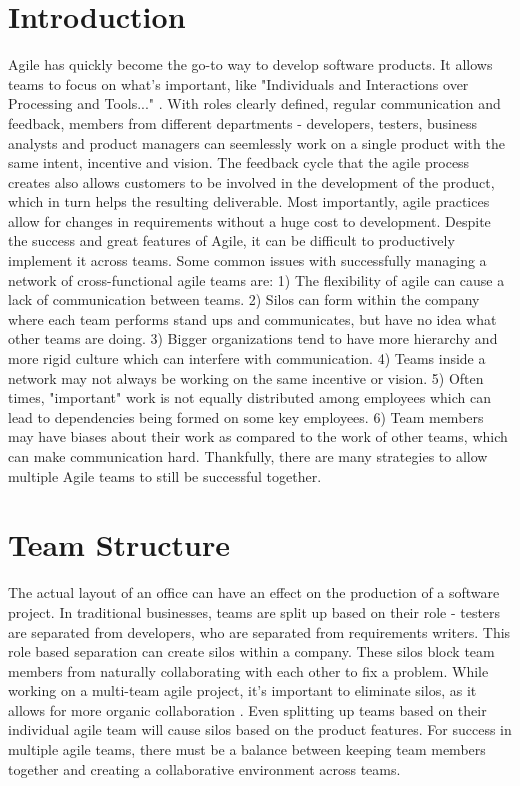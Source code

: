 \documentclass[sigplan,screen]{acmart}
\begin{document}
\section{Introduction}
Agile has quickly become the go-to way to develop software products.
It allows teams to focus on what's important, like "Individuals and Interactions over Processing and Tools..." \cite{b3}. 
With roles clearly defined, regular communication and feedback, members from different departments - developers, testers, business analysts and product managers can seemlessly work on a single product with the same intent, incentive and vision.
The feedback cycle that the agile process creates also allows customers to be involved in the development of the product, which in turn helps the resulting deliverable.
Most importantly, agile practices allow for changes in requirements without a huge cost to development.
Despite the success and great features of Agile, it can be difficult to productively implement it across teams.
Some common issues with successfully managing a network of cross-functional agile teams are: \cite{b4}
1) The flexibility of agile can cause a lack of communication between teams. 2) Silos can form within the company where each team performs stand ups and communicates, but have no idea what other teams are doing.
3) Bigger organizations tend to have more hierarchy and more rigid culture which can interfere with communication. 4) Teams inside a network may not always be working on the same incentive or vision. 5) Often times, "important" work is not equally distributed among employees which can lead to dependencies being formed on some key employees.
6) Team members may have biases about their work as compared to the work of other teams, which can make communication hard.
Thankfully, there are many strategies to allow multiple Agile teams to still be successful together.
 
\section{Team Structure}
The actual layout of an office can have an effect on the production of a software project.
In traditional businesses, teams are split up based on their role - testers are separated from developers, who are separated from requirements writers.
This role based separation can create silos within a company. 
These silos block team members from naturally collaborating with each other to fix a problem.
While working on a multi-team agile project, it's important to eliminate silos, as it allows for more organic collaboration \cite{b1}.
Even splitting up teams based on their individual agile team will cause silos based on the product features.
For success in multiple agile teams, there must be a balance between keeping team members together and creating a collaborative environment across teams.
\end{document}
